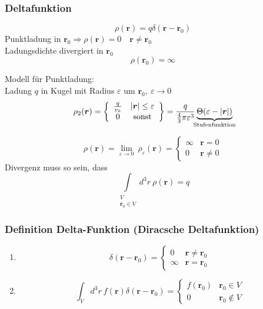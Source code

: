 \documentclass[titlepage,11pt,a4paper,ngerman]{report}
\newcommand{\delfkt}{\delta(\vec{r} - \vec{r}_0)}
\renewcommand{\vec}[1]{\boldsymbol{#1}}
\renewcommand{\epsilon}{\varepsilon}
\renewcommand{\paragraph}[1]{\subsubsection{#1}}
\begin{document}
\begin{minipage}{.6\linewidth}
	\paragraph{Deltafunktion}
	
	$$\rho (\vec{r}) = q \delta(\vec{r}-\vec{r}_0)$$
	Punktladung in $\vec{r}_0 \Rightarrow \rho(\vec{r}) = 0 \quad \vec{r} \neq \vec{r}_0$\\
	Ladungsdichte divergiert in $\vec{r}_0$
	$$\rho(\vec{r}_0) = \infty$$
\end{minipage}
\begin{minipage}{.4\linewidth}
	\centering
\end{minipage}

Modell für Punktladung:\\
Ladung $q$ in Kugel mit Radius $\epsilon$  um $\vec{r}_0,\ \epsilon \rightarrow 0$
$$\rho_2 (\vec{r}) = \left\{ \begin{array}{cc}
\frac{q}{v_k} & |\vec{r}| \leq \epsilon\\
0 & \textrm{sonst}	
\end{array} \right\} = \frac{q}{\frac{4}{3}\pi \epsilon^3}\underbrace{\Theta (\epsilon - |\vec{r}|)}_{\mathclap{\textrm{Stufenfunktion}}}$$




$$\rho(\vec{r}) = \lim_{\epsilon \rightarrow 0}\ \rho_\epsilon (\vec{r}) = \left\{ \begin{array}{cc}
\infty & \vec{r} = 0\\
0 & \vec{r} \neq 0
\end{array}\right.$$
Divergenz muss so sein, dass $$ \int\limits_{\substack{V \\ \vec{r}_0 \in V}} d^3r\ \rho(\vec{r}) = q$$

\paragraph{Definition Delta-Funktion (Diracsche Deltafunktion)}

\begin{enumerate}
	\item 
	$$\delta (\vec{r} - \vec{r}_0) = \left\{ \begin{array}{cc}
		0 & \vec{r} \neq \vec{r}_0 \\
		\infty & \vec{r} = \vec{r}_0
	\end{array}\right.$$
	\item 
	$$\int_V d^3 r\ f(\vec{r}) \delfkt = \left\{ \begin{array}{cc}
		f(\vec{r}_0) & \vec{r}_0 \in V\\
		0 & \vec{r}_0 \notin V
	\end{array}\right.$$ 
\end{enumerate}
\end{document}
